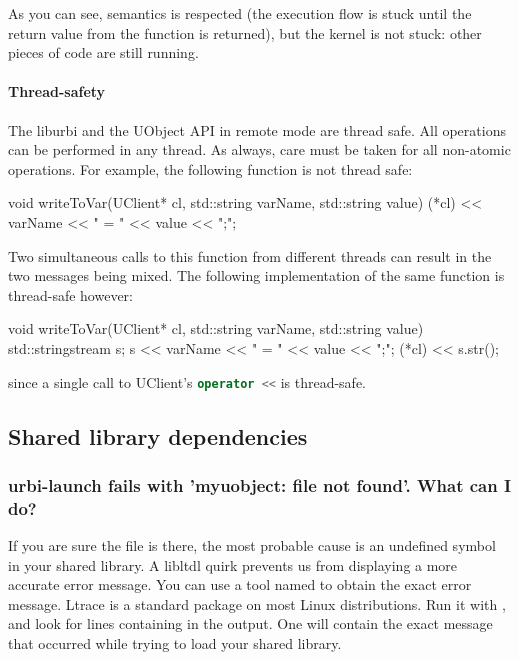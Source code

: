 As you can see, \urbi semantics is respected (the execution flow is
stuck until the return value from the function is returned), but the
kernel is not stuck: other pieces of code are still running.

\paragraph{Thread-safety}

The liburbi and the UObject API in remote mode are thread safe. All
operations can be performed in any thread. As always, care must be
taken for all non-atomic operations. For example, the following
function is not thread safe:

\begin{cxx}
void
writeToVar(UClient* cl, std::string varName, std::string value)
{
  (*cl) << varName << " = " << value << ";";
}
\end{cxx}

Two simultaneous calls to this function from different threads can
result in the two messages being mixed.  The following implementation
of the same function is thread-safe however:

\begin{cxx}
void
writeToVar(UClient* cl, std::string varName, std::string value)
{
  std::stringstream s;
  s << varName << " = " << value << ";";
  (*cl) << s.str();
}
\end{cxx}

\noindent
since a single call to UClient's \lstinline[language=C++]|operator <<|
is thread-safe.


\subsection{Shared library dependencies}
\subsubsection{urbi-launch fails with 'myuobject: file not found'. What can I do?}
If you are sure the file is there, the most probable cause is an
undefined symbol in your shared library. A libltdl quirk prevents us
from displaying a more accurate error message.  You can use a tool
named  to obtain the exact error message.  Ltrace is a
standard package on most Linux distributions.  Run it with
, and look for lines
containing  in the output. One will contain the exact
message that occurred while trying to load your shared library.


